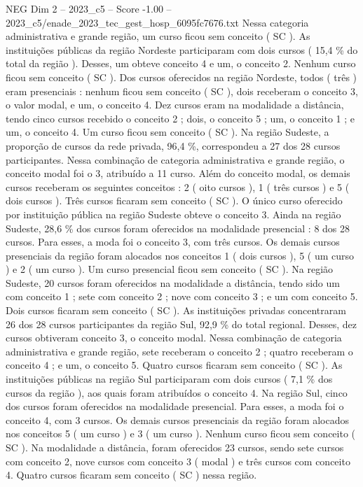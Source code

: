 \begin{textsample}{NEG Dim 2 – 2023\_c5 – Score -1.00 – 2023\_c5/enade\_2023\_tec\_gest\_hosp\_6095fc7676.txt}
Nessa categoria administrativa e grande região, um curso ficou sem conceito ( SC ).
As instituições públicas da região Nordeste participaram com dois cursos ( 15,4 \% do total da região ).
Desses, um obteve conceito 4 e um, o conceito 2.
Nenhum curso ficou sem conceito ( SC ).
Dos cursos oferecidos na região Nordeste, todos ( três ) eram presenciais : nenhum ficou sem conceito ( SC ), dois receberam o conceito 3, o valor modal, e um, o conceito 4.
Dez cursos eram na modalidade a distância, tendo cinco cursos recebido o conceito 2 ; dois, o conceito 5 ; um, o conceito 1 ; e um, o conceito 4.
Um curso ficou sem conceito ( SC ).
Na região Sudeste, a proporção de cursos da rede privada, 96,4 \%, correspondeu a 27 dos 28 cursos participantes.
Nessa combinação de categoria administrativa e grande região, o conceito modal foi o 3, atribuído a 11 curso.
Além do conceito modal, os demais cursos receberam os seguintes conceitos : 2 ( oito cursos ), 1 ( três cursos ) e 5 ( dois cursos ).
Três cursos ficaram sem conceito ( SC ).
O único curso oferecido por instituição pública na região Sudeste obteve o conceito 3.
Ainda na região Sudeste, 28,6 \% dos cursos foram oferecidos na modalidade presencial : 8 dos 28 cursos.
Para esses, a moda foi o conceito 3, com três cursos.
Os demais cursos presenciais da região foram alocados nos conceitos 1 ( dois cursos ), 5 ( um curso ) e 2 ( um curso ).
Um curso presencial ficou sem conceito ( SC ).
Na região Sudeste, 20 cursos foram oferecidos na modalidade a distância, tendo sido um com conceito 1 ; sete com conceito 2 ; nove com conceito 3 ; e um com conceito 5.
Dois cursos ficaram sem conceito ( SC ).
As instituições privadas concentraram 26 dos 28 cursos participantes da região Sul, 92,9 \% do total regional.
Desses, dez cursos obtiveram conceito 3, o conceito modal.
Nessa combinação de categoria administrativa e grande região, sete receberam o conceito 2 ; quatro receberam o conceito 4 ; e um, o conceito 5.
Quatro cursos ficaram sem conceito ( SC ).
As instituições públicas na região Sul participaram com dois cursos ( 7,1 \% dos cursos da região ), aos quais foram atribuídos o conceito 4.
Na região Sul, cinco dos cursos foram oferecidos na modalidade presencial.
Para esses, a moda foi o conceito 4, com 3 cursos.
Os demais cursos presenciais da região foram alocados nos conceitos 5 ( um curso ) e 3 ( um curso ).
Nenhum curso ficou sem conceito ( SC ).
Na modalidade a distância, foram oferecidos 23 cursos, sendo sete cursos com conceito 2, nove cursos com conceito 3 ( modal ) e três cursos com conceito 4.
Quatro cursos ficaram sem conceito ( SC ) nessa região.

\end{textsample}
